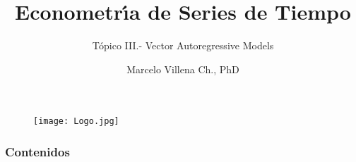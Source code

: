 \documentclass[spanish,xcolor=table]{beamer}
\title[ECO -TS101]{Econometr\'\i{}a de Series de Tiempo}
\subtitle{T\'opico III.- Vector Autoregressive Models}
\author{Marcelo Villena Ch., PhD}
\institute[UAI] %
{
Universidad Adolfo Ib\'a\~nez 
 \\ %
\medskip
}
\date{} %
\begin{document}
\begin{frame}

\begin{figure}[t!]
\texttt{[image: Logo.jpg]}
\end{figure}
\titlepage %
\end{frame}

\begin{frame}
\frametitle{Contenidos} 
\tableofcontents %
\end{frame}


\end{document}
